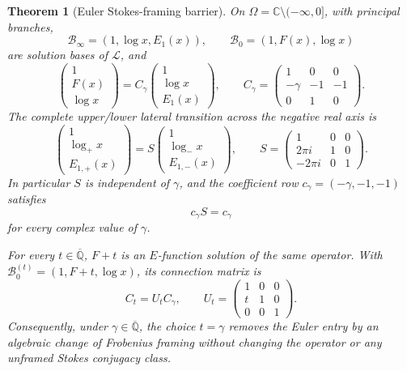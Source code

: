 \documentclass[11pt]{article}
\theoremstyle{keio}
\newtheorem{theorem}{Theorem}[section]
\theoremstyle{definition}
\theoremstyle{remark}
\newcommand{\Qbar}{\overline{\mathbb Q}}
\newcommand{\C}{\mathbb C}
\newcommand{\F}{\mathbb F}
\begin{document}
\begin{theorem}[Euler Stokes-framing barrier]
\label{thm:stokes-framing}
On \(\Omega=\C\setminus(-\infty,0]\), with principal branches,
\[
 \mathcal B_\infty=(1,\log x,E_1(x)),
 \qquad
 \mathcal B_0=(1,F(x),\log x)
\]
are solution bases of \(\mathcal L\), and
\begin{equation}\label{eq:C-gamma}
 \begin{pmatrix}1\\F(x)\\\log x\end{pmatrix}
 =C_\gamma
 \begin{pmatrix}1\\\log x\\E_1(x)\end{pmatrix},
 \qquad
 C_\gamma=
 \begin{pmatrix}
 1&0&0\\
 -\gamma&-1&-1\\
 0&1&0
 \end{pmatrix}.
\end{equation}
The complete upper/lower lateral transition across the negative real axis is
\begin{equation}\label{eq:stokes-transition}
 \begin{pmatrix}1\\\log_+x\\E_{1,+}(x)\end{pmatrix}
 =S
 \begin{pmatrix}1\\\log_-x\\E_{1,-}(x)\end{pmatrix},
 \qquad
 S=
 \begin{pmatrix}
 1&0&0\\
 2\pi i&1&0\\
 -2\pi i&0&1
 \end{pmatrix}.
\end{equation}
In particular \(S\) is independent of \(\gamma\), and the coefficient row
\(c_\gamma=(-\gamma,-1,-1)\) satisfies
\begin{equation}\label{eq:stokes-cocycle-blind}
 \boxed{c_\gamma S=c_\gamma}
\end{equation}
for every complex value of \(\gamma\).

For every \(t\in\Qbar\), \(F+t\) is an \(E\)-function solution of the same
operator.  With \(\mathcal B_0^{(t)}=(1,F+t,\log x)\), its connection
matrix is
\begin{equation}\label{eq:framing-shear}
 C_t=U_tC_\gamma,
 \qquad
 U_t=\begin{pmatrix}1&0&0\\t&1&0\\0&0&1\end{pmatrix}.
\end{equation}
Consequently, under \(\gamma\in\Qbar\), the choice \(t=\gamma\) removes
the Euler entry by an algebraic change of Frobenius framing without changing
the operator or any unframed Stokes conjugacy class.
\end{theorem}
\end{document}
